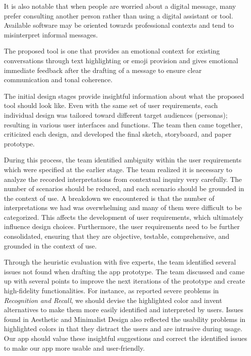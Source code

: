 \documentclass[acmsmall,screen,authorversion,nonacm]{acmart}
\begin{document}
It is also notable that when people are worried about a digital message, many prefer consulting another person rather than using a digital assistant or tool. Available software may be oriented towards professional contexts and tend to misinterpret informal messages. 

The proposed tool is one that provides an emotional context for existing conversations through text highlighting or emoji provision and gives emotional immediate feedback after the drafting of a message to ensure clear communication and tonal coherence. 

The initial design stages provide insightful information about what the proposed tool should look like. Even with the same set of user requirements, each individual design was tailored toward different target audiences (personas); resulting in various user interfaces and functions. The team then came together, criticized each design, and developed the final sketch, storyboard, and paper prototype. 

During this process, the team identified ambiguity within the user requirements which were specified at the earlier stage. The team realized it is necessary to analyze the recorded interpretations from contextual inquiry very carefully. The number of scenarios should be reduced, and each scenario should be grounded in the context of use. A breakdown we encountered is that the number of interpretations we had was overwhelming and many of them were difficult to be categorized. This affects the development of user requirements, which ultimately influence design choices. Furthermore, the user requirements need to be further consolidated, ensuring that they are objective, testable, comprehensive, and grounded in the context of use. 

Through the heuristic evaluation with five experts, the team identified several issues not found when drafting the app prototype. The team discussed and came up with several points to improve the next iterations of the prototype and create high-fidelity functionalities. For instance, as reported severe problems in \emph{Recognition and Recall}, we should devise the highlighted color and invent alternatives to make them more easily identified and interpreted by users. Issues found in Aesthetic and Minimalist Design also reflected the usability problems in highlighted colors in that they distract the users and are intrusive during usage. Our app should value these insightful suggestions and correct the identified issues to make our app more usable and user-friendly. 
\end{document}

